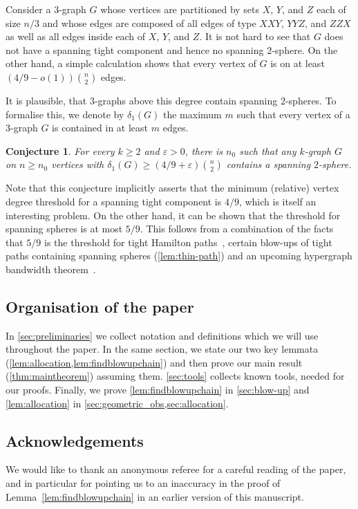 \documentclass[12pt,reqno]{amsart}
\theoremstyle{plain}
\newtheorem{conjecture}[theorem]{Conjecture}
\theoremstyle{definition}
\numberwithin{equation}{section}
\renewcommand{\geq}{\geqslant}
\newcommand{\eps}{\varepsilon}
\begin{document}
	Consider a $3$-graph $G$ whose vertices are partitioned by sets $X$, $Y$, and $Z$ each of size $n/3$ and whose edges are composed of all edges of type $XXY$, $YYZ$, and $ZZX$ as well as all edges inside each of $X$, $Y$, and $Z$.
	It is not hard to see that $G$ does not have a spanning tight component and hence no spanning $2$-sphere.
	On the other hand, a simple calculation shows that every vertex of $G$ is on at least $(4/9 - o(1)) \binom{n}{2}$ edges.
	
	It is plausible, that $3$-graphs above this degree contain spanning $2$-spheres.
	To formalise this, we denote by $\delta_1(G)$ the maximum $m$ such that every vertex of a $3$-graph $G$ is contained in at least $m$ edges.
	
	\begin{conjecture}
		For every $k \geq 2$ and $\eps > 0$, there is $n_0$ such that any $k$-graph $G$ on $n\geq n_0$ vertices with $\delta_1(G) \geq (4/9 + \eps ) \binom{n}{2}$ contains a spanning $2$-sphere.
	\end{conjecture}
	
	Note that this conjecture implicitly asserts that the minimum (relative) vertex degree threshold for a spanning tight component is $4/9$, which is itself an interesting problem.
	On the other hand, it can be shown that the threshold for spanning spheres is at most $5/9$.
	This follows from a combination of the facts that $5/9$ is the threshold for tight Hamilton paths~\cite{RRR19}, certain blow-ups of tight paths containing spanning spheres (\cref{lem:thin-path}) and an upcoming hypergraph bandwidth theorem~\cite{LS24}.
	
	
	\subsection{Organisation of the paper}
	
	In \cref{sec:preliminaries} we collect notation and definitions which we will use throughout the paper.
	In the same section, we state our two key lemmata (\cref{lem:allocation,lem:findblowupchain}) and then prove our main result (\cref{thm:maintheorem}) assuming them.
	\cref{sec:tools} collects known tools, needed for our proofs.
	Finally, we prove \cref{lem:findblowupchain} in \cref{sec:blow-up} and \cref{lem:allocation} in \cref{sec:geometric_obs,sec:allocation}.
	
	\subsection*{Acknowledgements} We would like to thank an anonymous referee for a careful reading of the paper, and in particular for pointing us to an inaccuracy in the proof of Lemma~\ref{lem:findblowupchain} in an earlier version of this manuscript.
	
\end{document}
